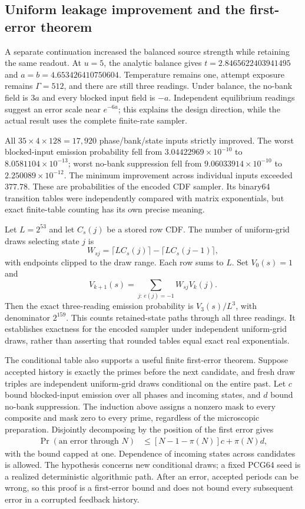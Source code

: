 \subsection{Uniform leakage improvement and the first-error theorem}

A separate continuation increased the balanced source strength while retaining the same readout. At $u=5$, the analytic balance gives $t=2.8465622403941495$ and $a=b=4.653426410750604$. Temperature remains one, attempt exposure remains $\Gamma=512$, and there are still three readings. Under balance, the no-bank field is $3a$ and every blocked input field is $-a$. Independent equilibrium readings suggest an error scale near $e^{-6a}$; this explains the design direction, while the actual result uses the complete finite-rate sampler.

All $35\times4\times128=17,920$ phase/bank/state inputs strictly improved. The worst blocked-input emission probability fell from $3.04422969\times10^{-10}$ to $8.0581104\times10^{-13}$; worst no-bank suppression fell from $9.06033914\times10^{-10}$ to $2.250089\times10^{-12}$. The minimum improvement across individual inputs exceeded $377.78$. These are probabilities of the encoded CDF sampler. Its binary64 transition tables were independently compared with matrix exponentials, but exact finite-table counting has its own precise meaning.

Let $L=2^{53}$ and let $C_s(j)$ be a stored row CDF. The number of uniform-grid draws selecting state $j$ is
\[
 W_{sj}=\lceil LC_s(j)\rceil-\lceil LC_s(j-1)\rceil,
\]
with endpoints clipped to the draw range. Each row sums to $L$. Set $V_0(s)=1$ and
\[
 V_{k+1}(s)=\sum_{j:\,e(j)=-1}W_{sj}V_k(j).
\]
Then the exact three-reading emission probability is $V_3(s)/L^3$, with denominator $2^{159}$. This counts retained-state paths through all three readings. It establishes exactness for the encoded sampler under independent uniform-grid draws, rather than asserting that rounded tables equal exact real exponentials.

The conditional table also supports a useful finite first-error theorem. Suppose accepted history is exactly the primes before the next candidate, and fresh draw triples are independent uniform-grid draws conditional on the entire past. Let $c$ bound blocked-input emission over all phases and incoming states, and $d$ bound no-bank suppression. The induction above assigns a nonzero mask to every composite and mask zero to every prime, regardless of the microscopic preparation. Disjointly decomposing by the position of the first error gives
\begin{align*}
 \Pr(\text{an error through }N)
 &\le [N-1-\pi(N)]c+\pi(N)d,
\end{align*}
with the bound capped at one. Dependence of incoming states across candidates is allowed. The hypothesis concerns new conditional draws; a fixed PCG64 seed is a realized deterministic algorithmic path. After an error, accepted periods can be wrong, so this proof is a first-error bound and does not bound every subsequent error in a corrupted feedback history.

